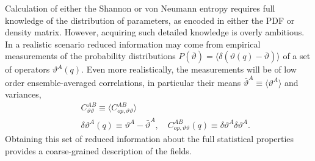\documentclass[11pt,a4paper]{article}
\def\avrg#1{{\langle #1 \rangle}}
\begin{document}
Calculation of either the Shannon or von Neumann entropy requires full knowledge of the distribution of parameters, as encoded in either the PDF or density matrix.
However, acquiring such detailed knowledge is overly ambitious.
In a realistic scenario reduced information may come from empirical measurements of the probability distributions $P(\bar{\vartheta}) = \avrg{ \delta ( \vartheta(q) - \bar{\vartheta} ) }$ of a set of operators $\vartheta^A (q)$. 
Even more realistically, the measurements will be of low order ensemble-averaged correlations, in particular their  means $\bar{\vartheta}^A \equiv \avrg{\vartheta^A}$ and variances, 
\begin{eqnarray}
  &&
  C_{\vartheta \vartheta}^{AB} \equiv \avrg{C_{op,\vartheta \vartheta}^{AB}} \\
&&    \delta \vartheta^A (q) \equiv  \vartheta^A - \bar{\vartheta}^A, \quad C_{op,\vartheta \vartheta}^{AB}(q)  \equiv \delta \vartheta^A \delta \vartheta^A . \nonumber
\end{eqnarray}
Obtaining this set of reduced information about the full statistical properties provides a coarse-grained description of the fields.
\end{document}

